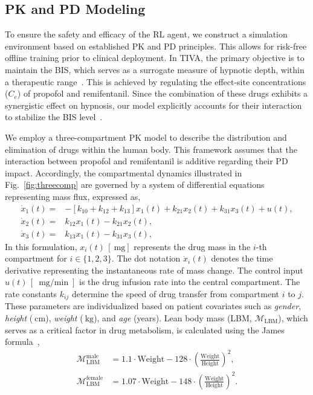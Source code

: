 \documentclass[pdflatex,sn-mathphys-num]{sn-jnl}%
\theoremstyle{thmstyleone}%
\theoremstyle{thmstyletwo}%
\theoremstyle{thmstylethree}%
\begin{document}
\subsection{PK and PD Modeling}
To ensure the safety and efficacy of the RL agent, we construct a simulation environment based on established PK and PD principles. This allows for risk-free offline training prior to clinical deployment. In TIVA, the primary objective is to maintain the BIS, which serves as a surrogate measure of hypnotic depth, within a therapeutic range~\citep{gla_97bis}. This is achieved by regulating the effect-site concentrations ($C_e$) of propofol and remifentanil. Since the combination of these drugs exhibits a synergistic effect on hypnosis, our model explicitly accounts for their interaction to stabilize the BIS level~\citep{sch_09_res}.

We employ a three-compartment PK model to describe the distribution and elimination of drugs within the human body. This framework assumes that the interaction between propofol and remifentanil is additive regarding their PD impact. Accordingly, the compartmental dynamics illustrated in Fig.~\ref{fig:threecomp} are governed by a system of differential equations representing mass flux, expressed as,
\begin{align}
    \dot{x}_{1}(t) =& -[k_{10}\!+\!k_{12}\!+\!k_{13}]x_{1}(t) \!+\! k_{21}x_{2}(t) \!+\! k_{31}x_{3}(t) \!+\! u(t), \\
    \dot{x}_{2}(t) =& k_{12}x_{1}(t) - k_{21}x_{2}(t), \\
    \dot{x}_{3}(t) =& k_{13}x_{1}(t) - k_{31}x_{3}(t), 
\end{align}
In this formulation, $x_{i}(t) \,[\SI{}{\mg}]$ represents the drug mass in the $i$-th compartment for $i \in \{1, 2, 3\}$. The dot notation $\dot{x}_{i}(t)$ denotes the time derivative representing the instantaneous rate of mass change. The control input $u(t) \,[\SI{}{\mg\per\min}]$ is the drug infusion rate into the central compartment. The rate constants $k_{ij}$ determine the speed of drug transfer from compartment $i$ to $j$. These parameters are individualized based on patient covariates such as \textit{gender}, \textit{height} ($\SI{}{\cm}$), \textit{weight} ($\SI{}{\kg}$), and \textit{age} (years). Lean body mass (LBM, $\mathcal{M}_{\text{LBM}}$), which serves as a critical factor in drug metabolism, is calculated using the James formula~\citep{car_18_lea},
\begin{align}
    \mathcal{M}_{\text{LBM}}^{\text{male}} &= 1.1 \cdot \text{Weight} - 128 \cdot \left(\frac{\text{Weight}}{\text{Height}}\right)^2, \\
    \mathcal{M}_{\text{LBM}}^{\text{female}} &= 1.07 \cdot \text{Weight} - 148 \cdot \left(\frac{\text{Weight}}{\text{Height}}\right)^2. 
\end{align}
\end{document}
